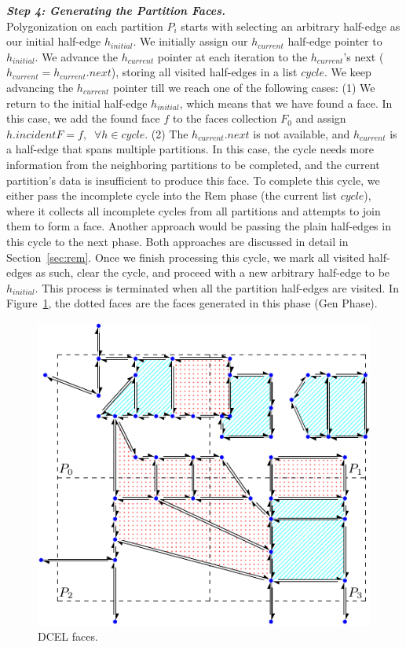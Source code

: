\vspace{4pt}
\textit{\textbf{Step 4: Generating the Partition Faces.}}
\\
Polygonization on each partition $P_i$ starts with selecting an arbitrary half-edge as our initial half-edge $h_{initial}$.
We initially assign our $h_{current}$ half-edge pointer to $h_{initial}$. We advance the $h_{current}$ pointer at each iteration to the $h_{current}$'s next ($h_{current} = h_{current}.next$), storing all visited half-edges in a list $cycle$. We keep advancing the $h_{current}$ pointer till we reach one of the following cases:
(1) We return to the initial half-edge $h_{initial}$, which means that we have found a face. In this case, we add the found face $f$ to the faces collection $F_0$ and assign $h.incidentF = f, \;\; \forall h \in cycle$.
(2) The $h_{current}.next$ is not available, and $h_{current}$ is a half-edge that spans multiple partitions. In this case, the cycle needs more information from the neighboring partitions to be completed, and the current partition's data is insufficient to produce this face.
To complete this cycle, we either pass the incomplete cycle into the Rem phase (the current list $cycle$), where it collects all incomplete cycles from all partitions and attempts to join them to form a face. Another approach would be passing the plain half-edges in this cycle to the next phase. Both approaches are discussed in detail in Section~\ref{sec:rem}.
Once we finish processing this cycle, we mark all visited half-edges as such, clear the cycle, and proceed with a new arbitrary half-edge to be $h_{initial}$.
This process is terminated when all the partition half-edges are visited.
In Figure~\ref{fig:ddcel:faces}, the dotted faces are the faces generated in this phase (Gen Phase).

\begin{figure}[tb]
	\centering
	\includegraphics[width=0.75 \linewidth ]{chapter2/model/ddcel-3}
	\caption{DCEL faces.}
	\label{fig:ddcel:faces}
\end{figure}
